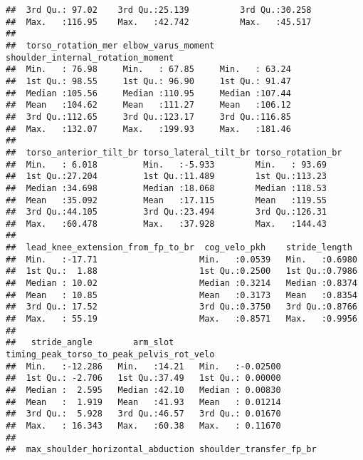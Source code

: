 \documentclass[
]{article}
\begin{document}
\begin{verbatim}
##  3rd Qu.: 97.02    3rd Qu.:25.139          3rd Qu.:30.258        
##  Max.   :116.95    Max.   :42.742          Max.   :45.517        
##                                                                  
##  torso_rotation_mer elbow_varus_moment shoulder_internal_rotation_moment
##  Min.   : 76.98     Min.   : 67.85     Min.   : 63.24                   
##  1st Qu.: 98.55     1st Qu.: 96.90     1st Qu.: 91.47                   
##  Median :105.56     Median :110.95     Median :107.44                   
##  Mean   :104.62     Mean   :111.27     Mean   :106.12                   
##  3rd Qu.:112.65     3rd Qu.:123.17     3rd Qu.:116.85                   
##  Max.   :132.07     Max.   :199.93     Max.   :181.46                   
##                                                                         
##  torso_anterior_tilt_br torso_lateral_tilt_br torso_rotation_br
##  Min.   : 6.018         Min.   :-5.933        Min.   : 93.69   
##  1st Qu.:27.204         1st Qu.:11.489        1st Qu.:113.23   
##  Median :34.698         Median :18.068        Median :118.53   
##  Mean   :35.092         Mean   :17.115        Mean   :119.55   
##  3rd Qu.:44.105         3rd Qu.:23.494        3rd Qu.:126.31   
##  Max.   :60.478         Max.   :37.928        Max.   :144.43   
##                                                                
##  lead_knee_extension_from_fp_to_br  cog_velo_pkh    stride_length   
##  Min.   :-17.71                    Min.   :0.0539   Min.   :0.6980  
##  1st Qu.:  1.88                    1st Qu.:0.2500   1st Qu.:0.7986  
##  Median : 10.02                    Median :0.3214   Median :0.8374  
##  Mean   : 10.85                    Mean   :0.3173   Mean   :0.8354  
##  3rd Qu.: 17.52                    3rd Qu.:0.3750   3rd Qu.:0.8766  
##  Max.   : 55.19                    Max.   :0.8571   Max.   :0.9956  
##                                                                     
##   stride_angle        arm_slot     timing_peak_torso_to_peak_pelvis_rot_velo
##  Min.   :-12.286   Min.   :14.21   Min.   :-0.02500                         
##  1st Qu.: -2.706   1st Qu.:37.49   1st Qu.: 0.00000                         
##  Median :  2.595   Median :42.10   Median : 0.00830                         
##  Mean   :  1.919   Mean   :41.93   Mean   : 0.01214                         
##  3rd Qu.:  5.928   3rd Qu.:46.57   3rd Qu.: 0.01670                         
##  Max.   : 16.343   Max.   :60.38   Max.   : 0.11670                         
##                                                                             
##  max_shoulder_horizontal_abduction shoulder_transfer_fp_br

\end{verbatim}
\end{document}

